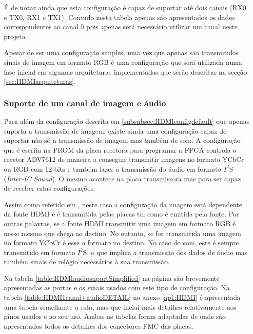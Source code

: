 É de notar ainda que esta configuração é capaz de suportar até dois canais (RX0 e TX0, RX1 e TX1). Contudo nesta tabela apenas são apresentados os dados correspondentes ao canal 0 pois apenas será necessário utilizar um canal neste projeto. 

Apesar de ser uma configuração simples, uma vez que apenas são transmitidos sinais de imagem em formato RGB é uma configuração que será utilizada numa fase inicial em algumas arquiteturas implementadas que serão descritas na secção \ref{sec:HDMIarquiteturas}.

\subsubsection{Suporte de um canal de imagem e áudio} \label {subsubsec:HDMIconfig+audio}

Para além da configuração descrita em \ref{subsubsec:HDMIconfigdefault} que apenas suporta a transmissão de imagem, existe ainda uma configuração capaz de suportar não só a transmissão de imagem mas também de som. A configuração que é escrita na PROM da placa recetora para programar a FPGA controla o recetor ADV7612 de maneira a conseguir transmitir imagens no formato YCbCr ou RGB com 12 bits e também fazer a transmissão do áudio em formato $I^{2}$S (\textit{Inter-IC Sound}). O mesmo acontece na placa transmissora mas para ser capaz de receber estas configurações.

Assim como referido em \cite{R014}, neste caso a configuração da imagem está dependente da fonte HDMI e é transmitida pelas placas tal como é emitida pela fonte. Por outras palavras, se a fonte HDMI transmitir uma imagem em formato RGB é nesse mesmo que chega ao destino. No entanto, se for transmitida uma imagem no formato YCbCr é esse o formato no destino. No caso do som, este é sempre transmitido em formato $I^{2}$S, o que implica a transmissão dos dados de áudio mas também sinais de relógio necessários à sua transmissão.

Na tabela \ref{table:HDMIaudiosuportSimplified} na página \pageref{table:HDMIaudiosuportSimplified} são brevemente apresentadas as portas e os sinais usados com este tipo de configuração. Na tabela \ref{table:HDMI1canal+audioDETAIL} no anexo \ref{ap1:HDMI} é apresentada uma tabela semelhante a esta, mas que inclui mais detalhes relativamente aos pinos usados e ao seu uso. Ambas as tabelas foram adaptadas de \cite{R014} onde são apresentados todos os detalhes dos conectores FMC das placas.

